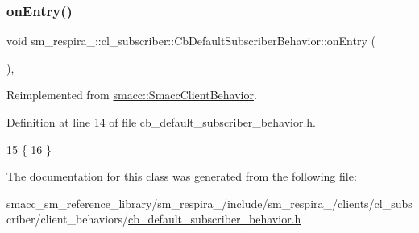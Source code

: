 \subsubsection{\texorpdfstring{on\+Entry()}{onEntry()}}
{\footnotesize\ttfamily void sm\+\_\+respira\+\_\+::cl\+\_\+subscriber\+::\+Cb\+Default\+Subscriber\+Behavior\+::on\+Entry (\begin{DoxyParamCaption}{ }\end{DoxyParamCaption})\hspace{0.3cm}{\ttfamily [inline]}, {\ttfamily [virtual]}}



Reimplemented from \hyperlink{classsmacc_1_1SmaccClientBehavior_ad5d3e1f1697c3cfe66c94cadba948493}{smacc\+::\+Smacc\+Client\+Behavior}.



Definition at line 14 of file cb\+\_\+default\+\_\+subscriber\+\_\+behavior.\+h.


\begin{DoxyCode}
15     \{
16     \}
\end{DoxyCode}


The documentation for this class was generated from the following file\+:\begin{DoxyCompactItemize}
\item 
smacc\+\_\+sm\+\_\+reference\+\_\+library/sm\+\_\+respira\+\_/include/sm\+\_\+respira\+\_/clients/cl\+\_\+subscriber/client\+\_\+behaviors/\hyperlink{sm__respira__1_2include_2sm__respira__1_2clients_2cl__subscriber_2client__behaviors_2cb__default__subscriber__behavior_8h}{cb\+\_\+default\+\_\+subscriber\+\_\+behavior.\+h}\end{DoxyCompactItemize}
